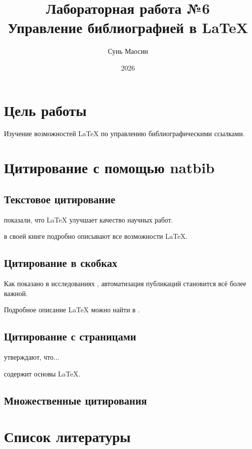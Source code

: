 \documentclass[a4paper,12pt]{article}
\title{Лабораторная работа №6 \\ Управление библиографией в LaTeX}
\author{Сунь Маосин}
\date{2026}
\begin{document}
\maketitle

\section{Цель работы}

Изучение возможностей LaTeX по управлению библиографическими ссылками.

\section{Цитирование с помощью natbib}

\subsection{Текстовое цитирование}

\citet{smith2023} показали, что LaTeX улучшает качество научных работ.

\citet{latex2024} в своей книге подробно описывают все возможности LaTeX.

\subsection{Цитирование в скобках}

Как показано в исследованиях \citep{konference2023}, автоматизация публикаций становится всё более важной.

Подробное описание LaTeX можно найти в \citep{latex2024}.

\subsection{Цитирование с страницами}

\citet[p.~45]{smith2023} утверждают, что...

\citep[см.][глава 2]{latex2024} содержит основы LaTeX.

\subsection{Множественные цитирования}

\citep{smith2023,latex2024,konference2023}

\section{Список литературы}



\end{document}
